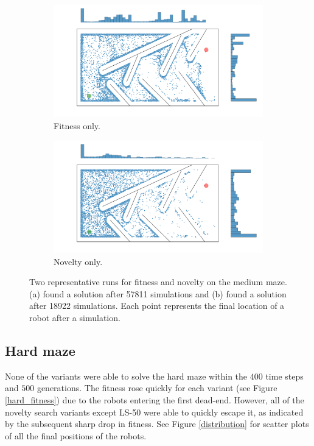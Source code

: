 \begin{figure}[H]
    \begin{mdframed}
        \begin{subfigure}[b]{0.45\textwidth}
            \includegraphics[scale=0.1]{resources/mazes/fitness_medium.png}
            \caption{Fitness only.}
            \label{fitness_only}
        \end{subfigure}
        \begin{subfigure}[b]{0.5\textwidth}
            \includegraphics[scale=0.1]{resources/mazes/novelty_medium.png}
            \caption{Novelty only.}
            \label{novelty_only}
        \end{subfigure}
    \end{mdframed}
    \caption{Two representative runs for fitness and novelty on the medium maze. (a) found a solution after 57811 simulations
    and (b) found a solution after 18922 simulations. Each point represents the final location
    of a robot after a simulation.}
    \label{typical_runs}
\end{figure}

\subsection{Hard maze}
None of the variants were able to solve the hard maze within the $400$ time steps and $500$ generations.
The fitness rose quickly for each variant (see Figure \ref{hard_fitness}) due to the
robots entering the first dead-end. However, all of the novelty search variants except LS-50
were able to quickly escape it, as indicated by the subsequent sharp drop in fitness.
See Figure \ref{distribution} for scatter plots of all the final positions of the robots.


